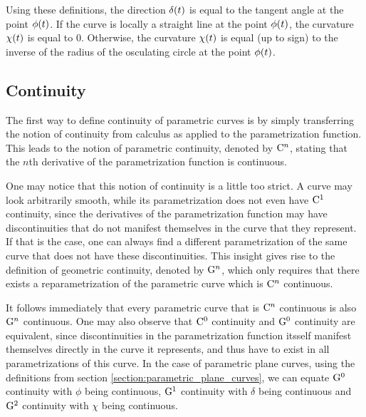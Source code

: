 \documentclass[a4paper]{article}
\begin{document}
			Using these definitions, the direction \(\delta\!\left( t \right)\) is equal to the tangent angle at the point \(\phi\!\left( t \right)\). If the curve is locally a straight line at the point \(\phi\!\left( t \right)\), the curvature \(\chi\!\left( t \right)\) is equal to \(0\). Otherwise, the curvature \(\chi\!\left( t \right)\) is equal (up to sign) to the inverse of the radius of the osculating circle at the point \(\phi\!\left( t \right)\).

		\subsection{Continuity}
		\label{section:continuity}

			The first way to define continuity of parametric curves is by simply transferring the notion of continuity from calculus as applied to the parametrization function. This leads to the notion of parametric continuity, denoted by \(\mathrm{C}^{n}\), stating that the \(n\)th derivative of the parametrization function is continuous.

			One may notice that this notion of continuity is a little too strict. A curve may look arbitrarily smooth, while its parametrization does not even have \(\mathrm{C}^{1}\) continuity, since the derivatives of the parametrization function may have discontinuities that do not manifest themselves in the curve that they represent. If that is the case, one can always find a different parametrization of the same curve that does not have these discontinuities. This insight gives rise to the definition of geometric continuity, denoted by \(\mathrm{G}^{n}\), which only requires that there exists a reparametrization of the parametric curve which is \(\mathrm{C}^{n}\) continuous.

			It follows immediately that every parametric curve that is \(\mathrm{C}^{n}\) continuous is also \(\mathrm{G}^{n}\) continuous. One may also observe that \(\mathrm{C}^{0}\) continuity and \(\mathrm{G}^{0}\) continuity are equivalent, since discontinuities in the parametrization function itsself manifest themselves directly in the curve it represents, and thus have to exist in all parametrizations of this curve. In the case of parametric plane curves, using the definitions from section \ref{section:parametric_plane_curves}, we can equate \(\mathrm{G}^{0}\) continuity with \(\phi\) being continuous, \(\mathrm{G}^{1}\) continuity with \(\delta\) being continuous and \(\mathrm{G}^{2}\) continuity with \(\chi\) being continuous.

	\clearpage
\end{document}

